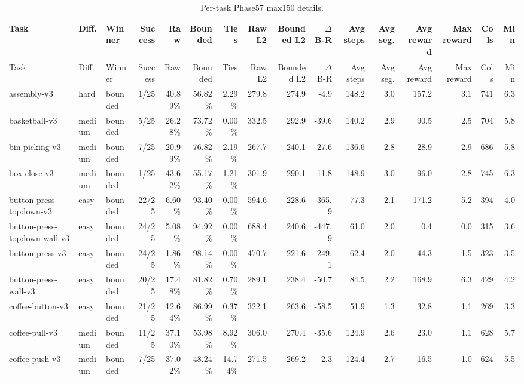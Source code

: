 \begin{landscape}
\small
\begin{longtable}{@{}l l l r r r r r r r r r r r r r@{}}
\caption{Per-task Phase57 max150 details.}\label{tab:phase57-max150-per-task}\\
\toprule
Task & Diff. & Winner & Success & Raw & Bounded & Ties & Raw L2 & Bounded L2 & $\Delta$ B-R & Avg steps & Avg seg. & Avg reward & Max reward & Cols & Min \\ 
\midrule
\endfirsthead
\toprule
Task & Diff. & Winner & Success & Raw & Bounded & Ties & Raw L2 & Bounded L2 & $\Delta$ B-R & Avg steps & Avg seg. & Avg reward & Max reward & Cols & Min \\ 
\midrule
\endhead
assembly-v3 & hard & bounded & 1/25 & 40.89\% & 56.82\% & 2.29\% & 279.8 & 274.9 & -4.9 & 148.2 & 3.0 & 157.2 & 3.1 & 741 & 6.3 \\
basketball-v3 & medium & bounded & 5/25 & 26.28\% & 73.72\% & 0.00\% & 332.5 & 292.9 & -39.6 & 140.2 & 2.9 & 90.5 & 2.5 & 704 & 5.8 \\
bin-picking-v3 & medium & bounded & 7/25 & 20.99\% & 76.82\% & 2.19\% & 267.7 & 240.1 & -27.6 & 136.6 & 2.8 & 28.9 & 2.9 & 686 & 5.8 \\
box-close-v3 & medium & bounded & 1/25 & 43.62\% & 55.17\% & 1.21\% & 301.9 & 290.1 & -11.8 & 148.9 & 3.0 & 96.0 & 2.8 & 745 & 6.3 \\
button-press-topdown-v3 & easy & bounded & 22/25 & 6.60\% & 93.40\% & 0.00\% & 594.6 & 228.6 & -365.9 & 77.3 & 2.1 & 171.2 & 5.2 & 394 & 4.0 \\
button-press-topdown-wall-v3 & easy & bounded & 24/25 & 5.08\% & 94.92\% & 0.00\% & 688.4 & 240.6 & -447.9 & 61.0 & 2.0 & 0.4 & 0.0 & 315 & 3.6 \\
button-press-v3 & easy & bounded & 24/25 & 1.86\% & 98.14\% & 0.00\% & 470.7 & 221.6 & -249.1 & 62.4 & 2.0 & 44.3 & 1.5 & 323 & 3.5 \\
button-press-wall-v3 & easy & bounded & 20/25 & 17.48\% & 81.82\% & 0.70\% & 289.1 & 238.4 & -50.7 & 84.5 & 2.2 & 168.9 & 6.3 & 429 & 4.2 \\
coffee-button-v3 & easy & bounded & 21/25 & 12.64\% & 86.99\% & 0.37\% & 322.1 & 263.6 & -58.5 & 51.9 & 1.3 & 32.8 & 1.1 & 269 & 3.3 \\
coffee-pull-v3 & medium & bounded & 11/25 & 37.10\% & 53.98\% & 8.92\% & 306.0 & 270.4 & -35.6 & 124.9 & 2.6 & 23.0 & 1.1 & 628 & 5.7 \\
coffee-push-v3 & medium & bounded & 7/25 & 37.02\% & 48.24\% & 14.74\% & 271.5 & 269.2 & -2.3 & 124.4 & 2.7 & 16.5 & 1.0 & 624 & 5.5 \\

\end{longtable}
\end{landscape}
